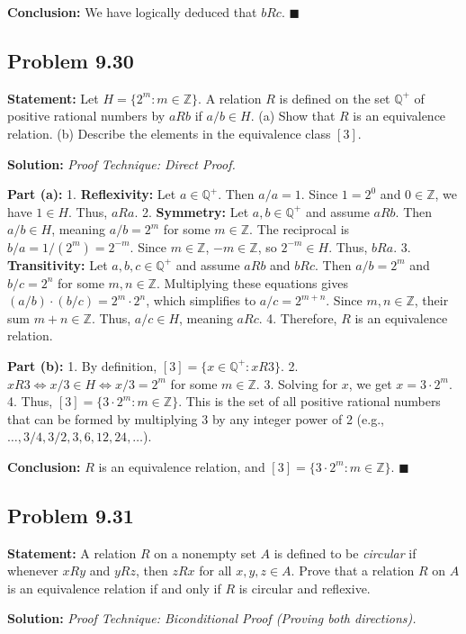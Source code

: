 \documentclass[11pt, a4paper]{article}
\theoremstyle{definition}
\theoremstyle{remark}
\newcommand{\Z}{\mathbb{Z}}
\newcommand{\Q}{\mathbb{Q}}
\begin{document}
\textbf{Conclusion:} We have logically deduced that $b R c$. $\blacksquare$

\subsection{Problem 9.30}
\textbf{Statement:} Let $H = \{2^m : m \in \Z\}$. A relation $R$ is defined on the set $\Q^+$ of positive rational numbers by $a R b$ if $a/b \in H$. 
(a) Show that $R$ is an equivalence relation. 
(b) Describe the elements in the equivalence class $[3]$.

\textbf{Solution:}
\textit{Proof Technique: Direct Proof.}

\textbf{Part (a):}
1. \textbf{Reflexivity:} Let $a \in \Q^+$. Then $a/a = 1$. Since $1 = 2^0$ and $0 \in \Z$, we have $1 \in H$. Thus, $a R a$.
2. \textbf{Symmetry:} Let $a, b \in \Q^+$ and assume $a R b$. Then $a/b \in H$, meaning $a/b = 2^m$ for some $m \in \Z$. The reciprocal is $b/a = 1/(2^m) = 2^{-m}$. Since $m \in \Z$, $-m \in \Z$, so $2^{-m} \in H$. Thus, $b R a$.
3. \textbf{Transitivity:} Let $a, b, c \in \Q^+$ and assume $a R b$ and $b R c$. Then $a/b = 2^m$ and $b/c = 2^n$ for some $m, n \in \Z$. Multiplying these equations gives $(a/b) \cdot (b/c) = 2^m \cdot 2^n$, which simplifies to $a/c = 2^{m+n}$. Since $m, n \in \Z$, their sum $m+n \in \Z$. Thus, $a/c \in H$, meaning $a R c$.
4. Therefore, $R$ is an equivalence relation.

\textbf{Part (b):}
1. By definition, $[3] = \{ x \in \Q^+ : x R 3 \}$.
2. $x R 3 \iff x/3 \in H \iff x/3 = 2^m$ for some $m \in \Z$.
3. Solving for $x$, we get $x = 3 \cdot 2^m$.
4. Thus, $[3] = \{ 3 \cdot 2^m : m \in \Z \}$. This is the set of all positive rational numbers that can be formed by multiplying 3 by any integer power of 2 (e.g., $\dots, 3/4, 3/2, 3, 6, 12, 24, \dots$).

\textbf{Conclusion:} $R$ is an equivalence relation, and $[3] = \{ 3 \cdot 2^m : m \in \Z \}$. $\blacksquare$

\subsection{Problem 9.31}
\textbf{Statement:} A relation $R$ on a nonempty set $A$ is defined to be \textit{circular} if whenever $x R y$ and $y R z$, then $z R x$ for all $x, y, z \in A$. Prove that a relation $R$ on $A$ is an equivalence relation if and only if $R$ is circular and reflexive.

\textbf{Solution:}
\textit{Proof Technique: Biconditional Proof (Proving both directions).}
\end{document}
